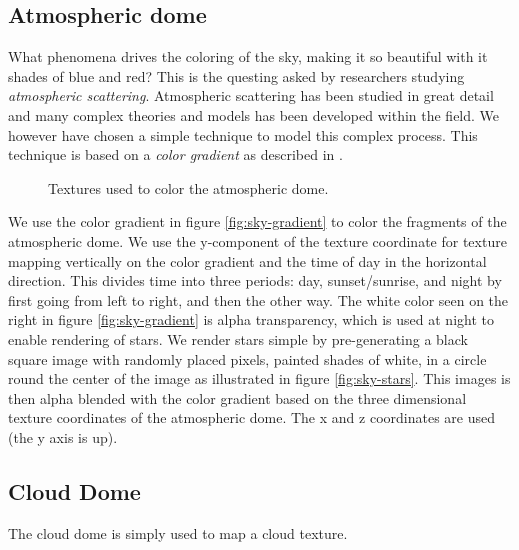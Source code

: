 \subsection{Atmospheric dome}
What phenomena drives the coloring of the sky, making it so beautiful
with it shades of blue and red?
This is the questing asked by researchers studying 
\emph{atmospheric scattering}. Atmospheric scattering has been studied
in great detail and many complex theories and models has been
developed within the field. We however have chosen a simple technique
to model this complex process. This technique is based on a
\emph{color gradient} as described in .

\begin{figure}[!h]
  \centering
  \hspace{8mm}
  \caption{Textures used to color the atmospheric dome.}
  \label{fig:atmosphere}
\end{figure}

We use the color gradient in figure \ref{fig:sky-gradient} to color
the fragments of the atmospheric dome. We use the y-component of the
texture coordinate for texture mapping vertically on the color
gradient and the time of day in the horizontal direction. This divides
time into three periods: day, sunset/sunrise, and night by first going
from left to right, and then the other way.
%
The white color seen on the right in figure \ref{fig:sky-gradient}
is alpha transparency, which is used at night to enable rendering of
stars. We render stars simple by pre-generating a black square image
with randomly placed pixels, painted shades of white, in a circle
round the center of the image as illustrated in figure
\ref{fig:sky-stars}. This images is then alpha blended with the color
gradient based on the three dimensional texture coordinates of the
atmospheric dome. The x and z coordinates are used (the y axis is up).

\subsection{Cloud Dome}
The cloud dome is simply used to map a cloud texture.

